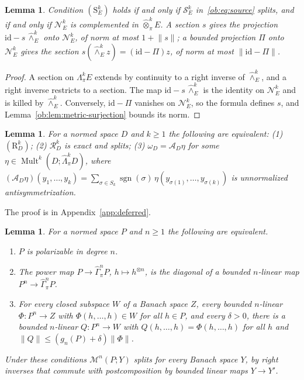 \documentclass[11pt]{amsart}
\newtheorem{lemma}[theorem]{Lemma}
\theoremstyle{definition}
\theoremstyle{remark}
\numberwithin{equation}{section}
\newcommand{\Mult}{\operatorname{Mult}}
\newcommand{\sgn}{\operatorname{sgn}}
\newcommand{\id}{\mathrm{id}}
\newcommand{\norm}[1]{\lVert #1\rVert}
\theoremstyle{plain}
\theoremstyle{definition}
\theoremstyle{plain}
\newcommand{\cN}{\mathcal N}
\newcommand{\cS}{\mathcal S}
\newcommand{\cR}{\mathcal R}
\newcommand{\cM}{\mathcal M}
\begin{document}
\begin{lemma}\label{ob:lem:source}
Condition $(\mathrm S^k_E)$ holds if and only if $\cS^k_E$ in~\eqref{ob:eq:source} splits, and if and only if $\cN^k_E$ is complemented in
$\widehat\otimes^k_\pi E$. A section $s$ gives the projection $\id-s\,\widehat\wedge^k_E$ onto $\cN^k_E$, of norm at most
$1+\norm s$; a bounded projection $\Pi$ onto $\cN^k_E$ gives the section $s(\widehat\wedge^k_Ez)=(\id-\Pi)z$, of norm at
most $\norm{\id-\Pi}$.
\end{lemma}

\begin{proof}
A section on $\Lambda^k_\pi E$ extends by continuity to a right inverse of $\widehat\wedge^k_E$, and a right inverse
restricts to a section. The map $\id-s\,\widehat\wedge^k_E$ is the identity on $\cN^k_E$ and is killed by
$\widehat\wedge^k_E$. Conversely, $\id-\Pi$ vanishes on $\cN^k_E$, so the formula defines $s$, and
Lemma~\ref{ob:lem:metric-surjection} bounds its norm.
\end{proof}

\begin{lemma}\label{ob:lem:target}
For a normed space $D$ and $k\ge1$ the following are equivalent: \textup{(1)} $(\mathrm R^k_D)$; \textup{(2)} $\cR^k_D$ is
exact and splits; \textup{(3)} $\omega_D=\mathcal A_D\eta$ for some $\eta\in\Mult^k(D;\widehat\Lambda^k_\pi D)$, where
$(\mathcal A_D\eta)(y_1,\dots,y_k)=\sum_{\sigma\in S_k}\sgn(\sigma)\,\eta(y_{\sigma(1)},\dots,y_{\sigma(k)})$ is
unnormalized antisymmetrization.
\end{lemma}

The proof is in Appendix~\ref{app:deferred}.

\begin{lemma}\label{ob:lem:parameter}
For a normed space $P$ and $n\ge1$ the following are equivalent.
\begin{enumerate}
\item $P$ is polarizable in degree $n$.
\item The power map $P\to\widehat\Gamma^n_\pi P$, $h\mapsto h^{\otimes n}$, is the diagonal of a bounded $n$-linear map
$P^n\to\widehat\Gamma^n_\pi P$.
\item For every closed subspace $W$ of a Banach space $Z$, every bounded $n$-linear $\Phi\colon P^n\to Z$ with
$\Phi(h,\dots,h)\in W$ for all $h\in P$, and every $\delta>0$, there is a bounded $n$-linear $Q\colon P^n\to W$ with
$Q(h,\dots,h)=\Phi(h,\dots,h)$ for all $h$ and $\norm Q\le(g_n(P)+\delta)\norm\Phi$.
\end{enumerate}
Under these conditions $\cM^n(P;Y)$ splits for every Banach space $Y$, by right inverses that commute with postcomposition
by bounded linear maps $Y\to Y'$.
\end{lemma}
\end{document}
